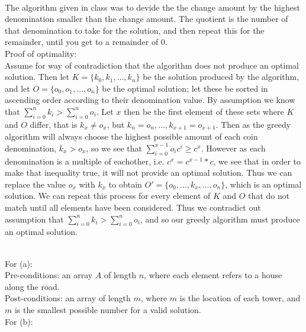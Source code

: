 \documentclass{assignment}
\begin{document}
\begin{problemlist}
\pbitem
\begin{problem}
\end{problem}
\begin{answer}
\\
The algorithm given in class was to devide the the change amount by the highest denomination smaller than the change amount. The quotient is the number of that denomination to take for the solution, and then repeat this for the remainder, until you get to a remainder of 0.\\
Proof of optimality:\\
Assume for way of contradiction that the algorithm does not produce an optimal solution. Then let $K=\{k_0,k_1,\ldots,k_n\}$ be the solution produced by the algorithm, and let $O=\{o_0,o_1,\ldots,o_n\}$ be the optimal solution; let these be sorted in ascending order according to their denomination value. By assumption we know that $\sum_{i=0}^n k_i > \sum_{i=0}^n o_i$. Let $x$ then be the first element of these sets where $K$ and $O$ differ, that is $k_x\neq o_x$, but $k_n=o_n,\ldots,k_{x+1}=o_{x+1}$. Then as the greedy algorithm will always choose the highest possible amount of each coin denomination, $k_x > o_x$, so we see that $\sum_{i=0}^{x-1} o_ic^i \ge c^x$. However as each denomination is a multiple of eachother, i.e. $c^x=c^{x-1}*c$, we see that in order to make that inequality true, it will not provide an optimal solution. Thus we can replace the value $o_x$ with $k_x$ to obtain $O'=\{o_0,\ldots,k_x,\ldots,o_n\}$, which is an optimal solution. We can repeat this process for every element of $K$ and $O$ that do not match until all elements have been considered. Thus we contradict out assumption that $\sum_{i=0}^n k_i > \sum_{i=0}^n o_i$, and so our greedy algorithm must produce an optimal solution.\\
\end{answer}
\clearpage
\pbitem
\begin{problem}
\end{problem}
\begin{answer}
\\
For (a):\\
Pre-conditions: an array $A$ of length $n$, where each element refers to a house along the road.\\
Post-conditions: an array of length $m$, where $m$ is the location of each tower, and $m$ is the smallest possible number for a valid solution.\\
For (b):\\

\end{answer}
\end{problemlist}
\end{document}
